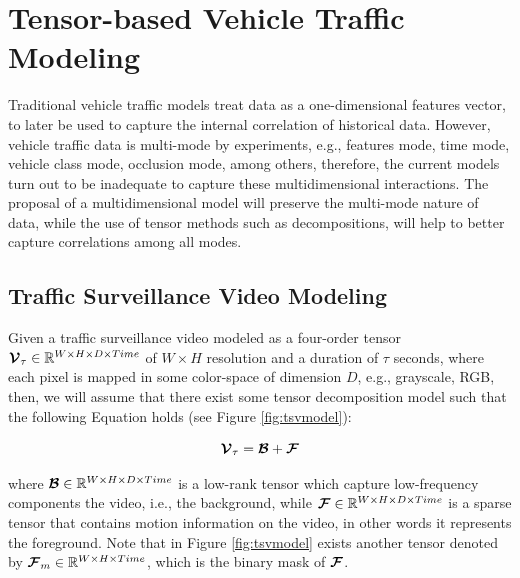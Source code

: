 \documentclass[sensors,article,submit,moreauthors,pdftex]{Definitions/mdpi}
\newcommand{\mathten}[1]{\boldsymbol{\mathbf{\mathcal{\MakeUppercase{#1}}}}}
\providecommand{\DIFadd}[1]{{\protect\color{blue}\uwave{#1}}} %
\providecommand{\DIFaddbegin}{} %
\providecommand{\DIFaddend}{} %
\begin{document}



\section{Tensor-based Vehicle Traffic Modeling}
Traditional vehicle traffic models treat data as a one-dimensional features vector, to later be used to capture the internal correlation of historical data. However, vehicle traffic data is multi-mode by experiments, e.g., features mode, time mode, vehicle class mode, occlusion mode, among others, therefore, the current models turn out to be inadequate to capture these multidimensional interactions. The proposal of a multidimensional model will preserve the multi-mode nature of data, while the use of tensor methods such as decompositions, will help to better capture correlations among all modes.

\subsection{Traffic Surveillance Video Modeling}

Given a traffic surveillance video modeled as a four-order tensor $\mathten{V}_\tau \in \mathbb{R}^{W\times H \times D \times Time}$ of $W \times H$ resolution and a duration of $\tau$ seconds, \DIFaddbegin \DIFadd{and }\DIFaddend where each pixel is mapped in some color-space of dimension $D$, e.g., grayscale, RGB, then, we will assume that there exist some tensor decomposition model such that the following Equation holds (see Figure \ref{fig:tsvmodel}):

\begin{equation}
\mathten{V}_\tau = \mathten{B} + \mathten{F}
\label{eq:tsvmodel}
\end{equation}

where $\mathten{B} \in \mathbb{R}^{W\times H \times D \times Time}$ is a low-rank tensor which capture low-frequency components the video, i.e., the background, while $\mathten{F} \in \mathbb{R}^{W\times H \times D \times Time}$ is a sparse tensor that contains motion information on the video, in other words it represents the foreground. Note that in Figure \ref{fig:tsvmodel} exists another tensor denoted by $\mathten{F}_m \in \mathbb{R}^{W\times H \times Time}$, which is the binary mask of $\mathten{F}$.
\end{document}

